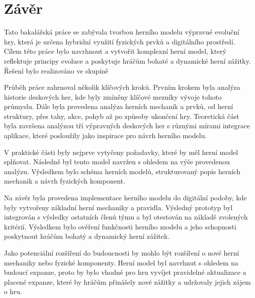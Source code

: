 \chapter{Závěr}

Tato bakalářská práce se zabývala tvorbou herního modelu výpravné evoluční hry, která je určena hybridní využití fyzických prvků a digitálního prostředí. Cílem této práce bylo navrhnout a vytvořit komplexní herní model, který reflektuje principy evoluce a poskytuje hráčům bohaté a dynamické herní zážitky. Řešení bylo realizováno ve skupině

Průběh práce zahrnoval několik klíčových kroků. Prvním krokem byla analýza historie deskových her, kde byly zmíněny klíčové mezníky vývoje tohoto průmyslu. Dále byla provedena analýza herních mechanik a prvků, od herní struktury, přes tahy, akce, pohyb až po způsoby ukončení hry. Teoretická část byla završena analýzou tří výpravných deskových her s různými mírami integrace aplikace, které posloužily jako inspirace pro návrh herního modelu.

V praktické části byly nejprve vytyčeny požadavky, které by měl herní model splňovat. Následně byl tento model navržen s ohledem na výše provedenou analýzu. Výsledkem bylo schéma herních modelů, strukturovaný popis herních mechanik a návrh fyzických komponent.

Na závěr byla provedena implementace herního modelu do digitální podoby, kde byly vytvořeny základní herní mechaniky a pravidla. Výsledný prototyp byl integrován s výsledky ostatních členů týmu a byl otestován na základě zvolených kritérií. Výsledkem bylo ověření funkčnosti herního modelu a jeho schopnosti poskytnout hráčům bohatý a dynamický herní zážitek.

Jako potenciální rozšíření do budoucnosti by mohlo být rozšíření o nové herní mechaniky nebo fyzické komponenty. Herní model byl navrhnut s ohledem na budoucí expanze, proto by bylo vhodné pro hru vyvíjet pravidelné aktualizace a placené expanze, které by hráčům přinášely nové zážitky a udržovaly jejich zájem o hru.

